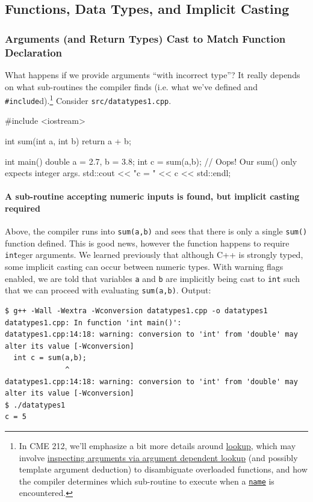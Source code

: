 \documentclass[12pt,letterpaper,twoside]{article}
\begin{document}
\subsection{Functions, Data Types, and Implicit Casting}
\subsubsection{Arguments (and Return Types) Cast to Match Function Declaration}
What happens if we provide arguments ``with incorrect type''? It really depends on what sub-routines the compiler finds (i.e. what we've defined and \texttt{\#include}d).\footnote{In CME 212, we'll emphasize a bit more details around
\href{https://en.cppreference.com/w/cpp/language/lookup}{lookup}, which may involve 
\href{https://en.cppreference.com/w/cpp/language/adl}{inspecting arguments via argument dependent lookup} (and possibly template argument deduction) to disambiguate overloaded functions, 
and how the compiler
determines which sub-routine to execute when a \href{https://en.cppreference.com/w/cpp/language/identifiers#Names}{\texttt{name}} is encountered.} 
Consider \texttt{src/datatypes1.cpp}.

\begin{cpp}
#include <iostream>

int sum(int a, int b) {
  return a + b;
}

int main() {
  double a = 2.7, b = 3.8;
  int c = sum(a,b);   // Oops! Our sum() only expects integer args.
  std::cout << "c = " << c << std::endl;
}
\end{cpp}

\paragraph{A sub-routine accepting numeric inputs is found, but implicit casting required}
Above, the compiler runs into \texttt{sum(a,b)} and sees that there is only a single 
\texttt{sum()} function defined. This is good news, however the function happens to require
\texttt{int}eger arguments. We learned previously that although C++ is strongly typed,
some implicit casting can occur between numeric types.
With warning flags enabled, we are told that
variables \texttt{a} and \texttt{b} are implicitly being cast to \texttt{int} such that we can
proceed with evaluating \texttt{sum(a,b)}. Output:

{\small
\begin{verbatim}
$ g++ -Wall -Wextra -Wconversion datatypes1.cpp -o datatypes1
datatypes1.cpp: In function 'int main()':
datatypes1.cpp:14:18: warning: conversion to 'int' from 'double' may alter its value [-Wconversion]
  int c = sum(a,b);
              ^
datatypes1.cpp:14:18: warning: conversion to 'int' from 'double' may alter its value [-Wconversion]
$ ./datatypes1
c = 5
\end{verbatim}
}
\end{document}
